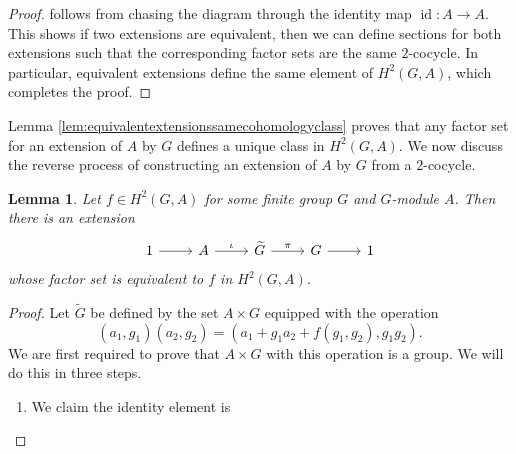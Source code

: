 \documentclass{dcthesis}
\newcommand{\mm}[1]{{\color{blue} \sf MM: [#1]}}
\newcommand{\wt}[1]{\widetilde{#1}}
\DeclareMathOperator{\id}{id}
\newtheorem{lemma}[prop]{Lemma}
\theoremstyle{definition}
\theoremstyle{remark}
\numberwithin{equation}{section}
\numberwithin{figure}{section}
\begin{document}
{{\begin{proof}
      follows from chasing the diagram through the
      identity map $\id\colon A\to A$.
      This shows if two extensions are equivalent,
      then we can define sections for both extensions
      such that the corresponding factor sets
      are the same $2$-cocycle.
      In particular,
      equivalent extensions define the same
      element of $H^2(G,A)$,
      which completes the proof.
    \end{proof}
    Lemma \ref{lem:equivalentextensionssamecohomologyclass}
    proves that any factor set for an
    extension of $A$ by $G$
    defines a unique class in
    $H^2(G,A)$.
    We now discuss the reverse process
    of constructing an extension of $A$ by $G$
    from a $2$-cocycle.
    \begin{lemma}
      \label{lem:constructextensionfromcocycle}
      Let $f\in H^2(G,A)$ for some finite group $G$
      and $G$-module $A$.
      Then there is an extension
      \begin{equation}
        \label{eqn:extensionfromcocycle}
        \begin{tikzcd}
          1\arrow{r}&A\arrow{r}{\iota}&\wt{G}\arrow{r}{\pi}
                    &G\arrow{r}&1
        \end{tikzcd}
      \end{equation}
      whose factor set is equivalent to $f$ in $H^2(G,A)$.
    \end{lemma}
    \begin{proof}
      Let $\wt{G}$ be defined by the set $A\times G$ equipped
      with the operation
      \begin{equation}
        \label{eqn:Efmultiplication}
        (a_1,g_1)(a_2,g_2)=
        (a_1+g_1a_2+f(g_1,g_2), g_1g_2).
      \end{equation}
      We are first required to prove that
      $A\times G$ with this operation is a group.
      We will do this in three steps.
      \begin{enumerate}
        \item
          \label{itm:identityelement}
          We claim the identity element is

\end{enumerate}
\end{proof}}}
\end{document}
